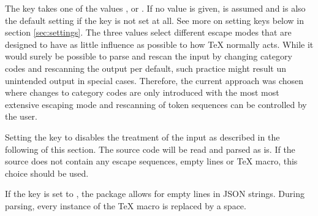 \documentclass[a4paper]{article}
\begin{document}
The key  takes one of the values ,  or . If no value is given,  is assumed and  is also the default setting if the key is not set at all. See more on setting keys below in section \ref{sec:settings}. The three values select different escape modes that are designed to have as little influence as possible to how TeX normally acts. While it would surely be possible to parse and rescan the input by changing category codes and rescanning the output per default, such practice might result un unintended output in special cases. Therefore, the current approach was chosen where changes to category codes are only introduced with the most most extensive escaping mode and rescanning of token sequences can be controlled by the user.

Setting the key to  disables the treatment of the input as described in the following of this section. The source code will be read and parsed as is. If the source does not contain any escape sequences, empty lines or TeX macro, this choice should be used.

If the key  is set to , the package allows for empty lines in JSON strings. During parsing, every instance of the TeX macro \macro{\par} is replaced by a space. 
\end{document}
